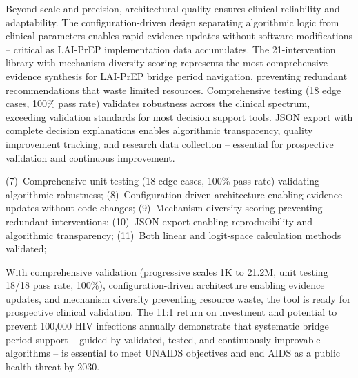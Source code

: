 Beyond scale and precision, architectural quality ensures clinical reliability and adaptability. The configuration-driven design separating algorithmic logic from clinical parameters enables rapid evidence updates without software modifications -- critical as LAI-PrEP implementation data accumulates. The 21-intervention library with mechanism diversity scoring represents the most comprehensive evidence synthesis for LAI-PrEP bridge period navigation, preventing redundant recommendations that waste limited resources. Comprehensive testing (18 edge cases, 100\% pass rate) validates robustness across the clinical spectrum, exceeding validation standards for most decision support tools. JSON export with complete decision explanations enables algorithmic transparency, quality improvement tracking, and research data collection -- essential for prospective validation and continuous improvement.



(7)~Comprehensive unit testing (18 edge cases, 100\% pass rate) validating algorithmic robustness; (8)~Configuration-driven architecture enabling evidence updates without code changes; (9)~Mechanism diversity scoring preventing redundant interventions; (10)~JSON export enabling reproducibility and algorithmic transparency; (11)~Both linear and logit-space calculation methods validated;



With comprehensive validation (progressive scales 1K to 21.2M, unit testing 18/18 pass rate, 100\%), configuration-driven architecture enabling evidence updates, and mechanism diversity preventing resource waste, the tool is ready for prospective clinical validation. The 11:1 return on investment and potential to prevent 100,000 HIV infections annually demonstrate that systematic bridge period support -- guided by validated, tested, and continuously improvable algorithms -- is essential to meet UNAIDS objectives and end AIDS as a public health threat by 2030.



